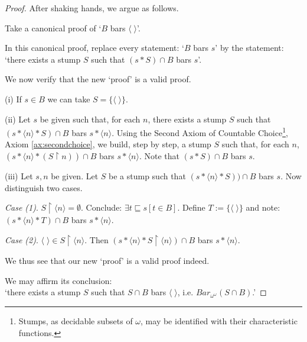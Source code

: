 \documentclass[a4paper]{amsart}
\theoremstyle{plain}
\begin{document}
\begin{proof}
 \smallskip
 After shaking hands, we
  argue as follows. 
 
 Take a canonical proof of `$B$ bars $\langle \;\rangle$'.
 
 In this canonical proof, replace every statement: `$B$ bars $s$' by the statement: `there exists a stump $S$ such that 
$(s\ast S )\cap B$ bars $s$'.

We now verify that the new `proof' is  a valid proof.

\smallskip (i) If $s\in B$ we can take $S=\{\langle\;\rangle\}$. 

(ii) Let $s$ be given such that, for each $n$, there exists a stump $S$ such that $(s\ast\langle n \rangle\ast S)\cap B$ bars $s\ast\langle n \rangle$. Using the Second Axiom of Countable Choice\footnote{Stumps, as decidable subsets of $\omega$, may be identified with their characteristic functions.}, Axiom \ref{ax:secondchoice}, we   build, step by step, a stump $S$ such that, for each $n$, $(s\ast\langle n \rangle\ast (S\upharpoonright n))\cap B$ bars $s\ast\langle n \rangle$. Note that $(s\ast S)\cap B$ bars $s$.

(iii) Let $s, n$ be given. Let $S$ be a stump such that $(s\ast\langle n\rangle \ast S))\cap B$ bars $s$. Now distinguish two cases.

\textit{Case (1)}. $S\upharpoonright \langle n \rangle =\emptyset$. Conclude: $\exists t \sqsubseteq s[t \in B]$. Define $T:=\{\langle\;\rangle\}$ and note: $(s\ast\langle n \rangle\ast T)\cap B$ bars $s\ast\langle n \rangle$.

\textit{Case (2)}. $\langle \; \rangle \in S\upharpoonright \langle n \rangle$. Then $(s\ast\langle n \rangle \ast S\upharpoonright\langle n \rangle)\cap B$ bars $s\ast\langle n \rangle$. 

\smallskip We thus see that our new `proof' is a valid proof indeed.

We may affirm its conclusion: \\`there exists a stump $S$ such that $S\cap B$ bars $\langle\;\rangle$, i.e. $Bar_{\omega^\omega}(S\cap B)$.'
 \end{proof}
 
\end{document}
